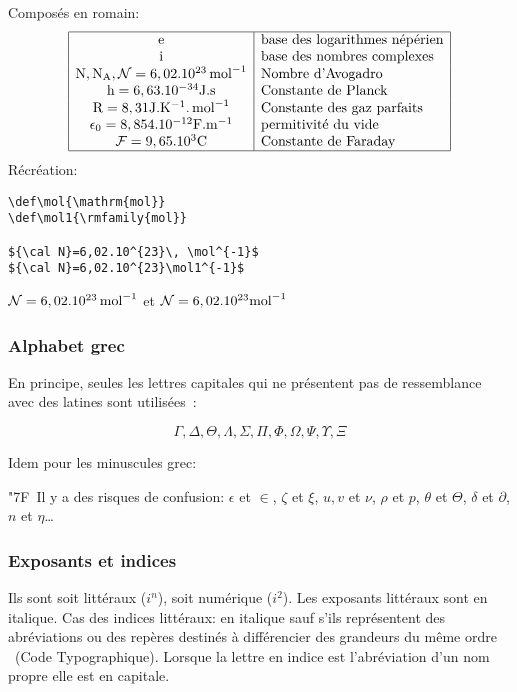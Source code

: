 \documentclass[twoside]{article}
\def\panneau{{\myl\char"7F}}
\begin{document}
\def\mol{\mathrm{mol}}
Compos\'es en romain:
$$
\begin{array}{|c|l|}
\hline
\mathrm{e} & \hbox{base des logarithmes n\'ep\'erien}\cr
\mathrm{i}  & \hbox{base des nombres complexes}\\
\mathrm{N, N_A, {\cal N}}=6,02.10^{23}\, \mol^{-1}& \hbox{Nombre d'Avogadro  }\\
\mathrm{h}=6,63.10^{-34} \mathrm{J.s}  & \hbox{Constante de Planck}\\
\mathrm{R}=8,31 \mathrm{J.K^{-1}.}\,\mol^{-1}  & \hbox{Constante des gaz parfaits}\\
\epsilon_0=8,854.10^{-12} \mathrm{F. m^{-1}}  & \hbox{permitivit\'e du vide}\\
\mathcal{F}=9,65.10^{3}\mathrm{C}  & \hbox{Constante de Faraday}\\
\hline
\end{array}
$$
R\'ecr\'eation:
\begin{verbatim}
\def\mol{\mathrm{mol}}
\def\mol1{\rmfamily{mol}}

${\cal N}=6,02.10^{23}\, \mol^{-1}$
${\cal N}=6,02.10^{23}\mol1^{-1}$
\end{verbatim}

${\cal N}=6,02.10^{23}\, \mol^{-1}$ et
${\cal N}=6,02.10^{23}\mol^{-1}$

\subsubsection{Alphabet grec}

En principe, seules les lettres capitales qui ne pr\'esentent pas de
ressemblance avec des latines sont utilis\'ees~:

$$\Gamma, \Delta, \Theta, \Lambda, \Sigma, \Pi, \Phi, \Omega, \Psi,
\Upsilon, \Xi$$

Idem pour les minuscules grec:

\panneau\ Il y a des risques de confusion: $\epsilon$ et $\in$, $\zeta$ et
$\xi$, $u,v$ et $\nu$, $\rho$ et $p$, $\theta$ et $\Theta$, $\delta$
et $\partial$, $n$ et $\eta$\ldots

\subsubsection{Exposants et indices}


Ils sont soit litt\'eraux ($i^{n}$), soit num\'erique ($i^2$).  Les
exposants litt\'eraux sont en italique. Cas des indices litt\'eraux:
en italique sauf \og s'ils repr\'esentent des abr\'eviations ou des
rep\`eres destin\'es \`a diff\'erencier des grandeurs du m\^eme ordre
\fg\ (Code Typographique). Lorsque la lettre en indice est 
l'abr\'eviation d'un nom propre elle est en capitale.
\end{document}
